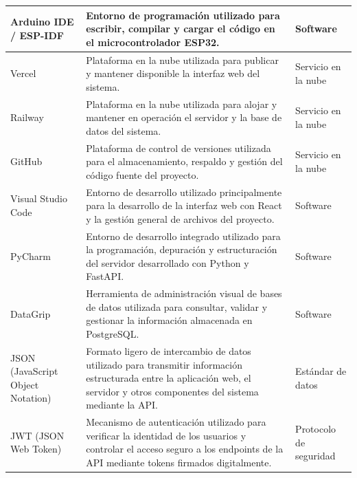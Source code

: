 \begin{longtable}{|p{3.5cm}|p{8cm}|p{2.5cm}|}
Arduino IDE / ESP-IDF &
Entorno de programación utilizado para escribir, compilar y cargar el código en el microcontrolador ESP32. &
Software \\
\hline

Vercel &
Plataforma en la nube utilizada para publicar y mantener disponible la interfaz web del sistema. &
Servicio en la nube \\
\hline

Railway &
Plataforma en la nube utilizada para alojar y mantener en operación el servidor y la base de datos del sistema. &
Servicio en la nube \\
\hline

GitHub &
Plataforma de control de versiones utilizada para el almacenamiento, respaldo y gestión del código fuente del proyecto. &
Servicio en la nube \\
\hline

Visual Studio Code &
Entorno de desarrollo utilizado principalmente para la desarrollo de la interfaz web con React y la gestión general de archivos del proyecto. &
Software \\
\hline

PyCharm &
Entorno de desarrollo integrado utilizado para la programación, depuración y estructuración del servidor desarrollado con Python y FastAPI. &
Software \\
\hline

DataGrip &
Herramienta de administración visual de bases de datos utilizada para consultar, validar y gestionar la información almacenada en PostgreSQL. &
Software \\
\hline

JSON (JavaScript Object Notation) &
Formato ligero de intercambio de datos utilizado para transmitir información estructurada entre la aplicación web, el servidor y otros componentes del sistema mediante la API. &
Estándar de datos \\
\hline

JWT (JSON Web Token) &
Mecanismo de autenticación utilizado para verificar la identidad de los usuarios y controlar el acceso seguro a los endpoints de la API mediante tokens firmados digitalmente. &
Protocolo de seguridad \\
\hline

\end{longtable}
\newpage







